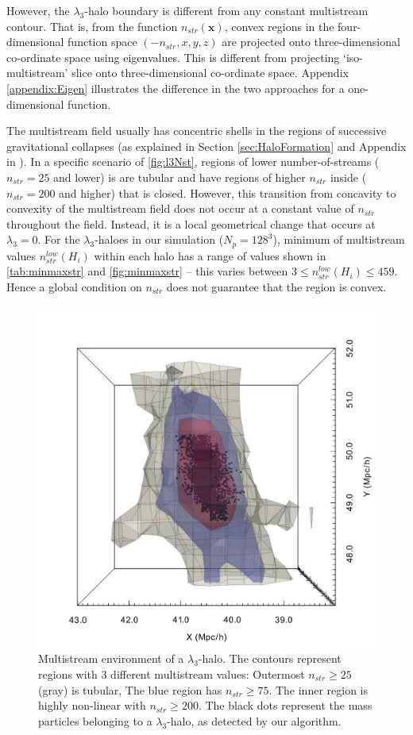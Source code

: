However, the $\lambda_3$-halo boundary is different from any constant multistream contour. That is, from the function $n_{str}(\mathbf{x})$, convex regions in the four-dimensional function space $(-n_{str}, x, y, z)$ are projected onto three-dimensional co-ordinate space using eigenvalues. This is different from projecting `iso-multistream' slice onto three-dimensional co-ordinate space. Appendix \ref{appendix:Eigen} illustrates the difference in the two approaches for a one-dimensional function. 


The multistream field usually has concentric shells in the regions of successive gravitational collapses (as explained in Section \ref{sec:HaloFormation} and Appendix in \citealt{Ramachandra2017}). In a specific scenario  of \autoref{fig:l3Nst}, regions of lower number-of-streams ($n_{str} = 25$ and lower) is are tubular and have regions of higher $n_{str}$ inside ($n_{str} = 200$ and higher) that is closed. However, this transition from concavity to convexity of the multistream field does not occur at a constant value of $n_{str}$ throughout the field. Instead, it is a local geometrical change that occurs at $\lambda_3 = 0$. For the $\lambda_3$-haloes in our simulation ($N_p = 128^3$), minimum of multistream values $n_{str}^{low}(H_i)$ within each halo has a range of values shown in \autoref{tab:minmaxstr} and \autoref{fig:minmaxstr} -- this varies between $ 3 \leq n_{str}^{low}(H_i) \leq 459$. Hence a global condition on $n_{str}$ does not guarantee that the region is convex. 



\begin{figure}
\begin{minipage}[t]{.99\linewidth}
  \centering\includegraphics[width=8.cm]{Chapter5/Source_v2/fig9.pdf} 
\end{minipage}\hfill
\caption{Multistream environment of a $\lambda_3$-halo. The contours represent regions with 3 different multistream values: Outermost $n_{str} \geq 25$ (gray) is tubular, The blue region has $n_{str} \geq 75$. The inner region is highly non-linear with $n_{str} \geq 200$.  The black dots represent the mass particles belonging to a $\lambda_3$-halo, as detected by our algorithm.}
\label{fig:l3Nst}
\end{figure}



